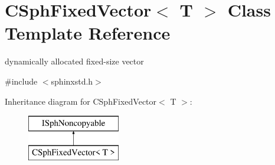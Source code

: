 \hypertarget{classCSphFixedVector}{\section{C\-Sph\-Fixed\-Vector$<$ T $>$ Class Template Reference}
\label{classCSphFixedVector}
}


dynamically allocated fixed-\/size vector  




{\ttfamily \#include $<$sphinxstd.\-h$>$}

Inheritance diagram for C\-Sph\-Fixed\-Vector$<$ T $>$\-:\begin{figure}[H]
\begin{center}
\leavevmode
\includegraphics[height=2.000000cm]{classCSphFixedVector}
\end{center}
\end{figure}
